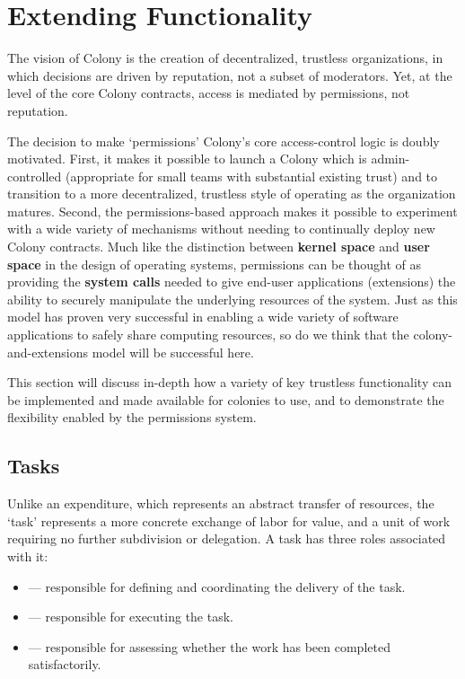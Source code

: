 \section{Extending Functionality}\label{sec:extensions}

The vision of Colony is the creation of decentralized, trustless organizations, in which decisions are driven by reputation, not a subset of moderators. Yet, at the level of the core Colony contracts, access is mediated by permissions, not reputation.

The decision to make `permissions' Colony's core access-control logic is doubly motivated. First, it makes it possible to launch a Colony which is admin-controlled (appropriate for small teams with substantial existing trust) and to transition to a more decentralized, trustless style of operating as the organization matures. Second, the permissions-based approach makes it possible to experiment with a wide variety of mechanisms without needing to continually deploy new Colony contracts. Much like the distinction between \textbf{kernel space} and \textbf{user space} in the design of operating systems, permissions can be thought of as providing the \textbf{system calls} needed to give end-user applications (extensions) the ability to securely manipulate the underlying resources of the system. Just as this model has proven very successful in enabling a wide variety of software applications to safely share computing resources, so do we think that the colony-and-extensions model will be successful here.

This section will discuss in-depth how a variety of key trustless functionality can be implemented and made available for colonies to use, and to demonstrate the flexibility enabled by the permissions system.

\subsection{Tasks}\label{sec:tasks}

Unlike an expenditure, which represents an abstract transfer of resources, the `task' represents a more concrete exchange of labor for value, and a unit of work requiring no further subdivision or delegation. A task has three roles associated with it:

\begin{itemize}
\item {} --- responsible for defining and coordinating the delivery of the task.
\item {} --- responsible for executing the task.
\item {} --- responsible for assessing whether the work has been completed satisfactorily.
\end{itemize}

